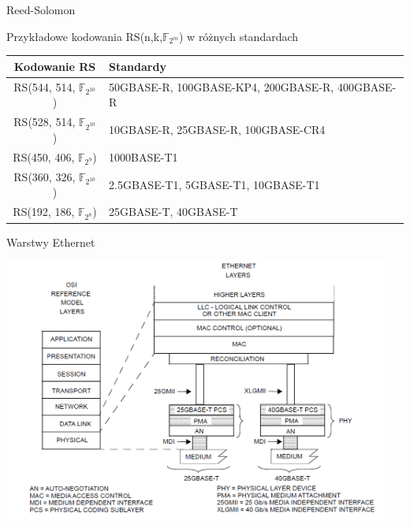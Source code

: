 \documentclass{beamer}
\begin{document}
\begin{frame}{Reed-Solomon}
	\begin{exampleblock}{Przykładowe kodowania RS(n,k,$\mathbb{F}_{2^m}$)
		w różnych standardach}
		\begingroup
			\begin{table}[h]
			\centering
				\begin{tabular}{c p{6cm}}
				\toprule
				Kodowanie RS & Standardy \\
				\midrule
				RS(544, 514, $\mathbb{F}_{2^{10}}$)  & 50GBASE-R, 100GBASE-KP4, 200GBASE-R, 400GBASE-R \\
				\midrule
				RS(528, 514, $\mathbb{F}_{2^{10}}$) & 10GBASE-R, 25GBASE-R, 100GBASE-CR4 \\
				\midrule
				RS(450, 406, $\mathbb{F}_{2^9}$)  & 1000BASE-T1 \\
				\midrule
				RS(360, 326, $\mathbb{F}_{2^{10}}$)  & 2.5GBASE-T1, 5GBASE-T1, 10GBASE-T1 \\
				\midrule
				RS(192, 186, $\mathbb{F}_{2^8}$)  & 25GBASE-T, 40GBASE-T \\
				\bottomrule
				\end{tabular}
			\end{table}
		\endgroup
	\end{exampleblock}
\end{frame}

\begin{frame}{Warstwy Ethernet}
	\begin{center}
        \includegraphics[width=0.95\textwidth,height=0.85\textheight,keepaspectratio]{25-40-gbase-osi.png}
    \end{center}
\end{frame}
\end{document}
